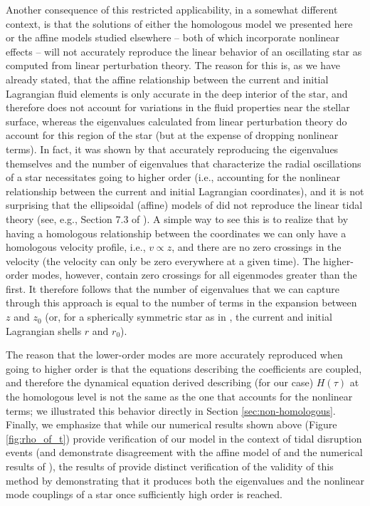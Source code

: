 \documentclass[twocolumn]{aastex62}
\begin{document}
Another consequence of this restricted applicability, in a somewhat different context, is that the solutions of either the homologous model we presented here or the affine models studied elsewhere -- both of which incorporate nonlinear effects -- will not accurately reproduce the linear behavior of an oscillating star as computed from linear perturbation theory. The reason for this is, as we have already stated, that the affine relationship between the current and initial Lagrangian fluid elements is only accurate in the deep interior of the star, and therefore does not account for variations in the fluid properties near the stellar surface, whereas the eigenvalues calculated from linear perturbation theory do account for this region of the star (but at the expense of dropping nonlinear terms). In fact, it was shown by \citet{coughlin21b} that accurately reproducing the eigenvalues themselves and the number of eigenvalues that characterize the radial oscillations of a star necessitates going to higher order (i.e., accounting for the nonlinear relationship between the current and initial Lagrangian coordinates), and it is not surprising that the ellipsoidal (affine) models of \citet{kochanek92, kosovichev92, lai94} did not reproduce the linear tidal theory (see, e.g., Section 7.3 of \citealt{lai94}). A simple way to see this is to realize that by having a homologous relationship between the coordinates we can only have a homologous velocity profile, i.e., $v \propto z$, and there are no zero crossings in the velocity (the velocity can only be zero everywhere at a given time). The higher-order modes, however, contain zero crossings for all eigenmodes greater than the first. It therefore follows that the number of eigenvalues that we can capture through this approach is equal to the number of terms in the expansion between $z$ and $z_0$ (or, for a spherically symmetric star as in \citealt{coughlin21b}, the current and initial Lagrangian shells $r$ and $r_0$). 

The reason that the lower-order modes are more accurately reproduced when going to higher order is that the equations describing the coefficients are coupled, and therefore the dynamical equation derived describing (for our case) $H(\tau)$ at the homologous level is not the same as the one that accounts for the nonlinear terms; we illustrated this behavior directly in Section \ref{sec:non-homologous}. Finally, we emphasize that while our numerical results shown above (Figure \ref{fig:rho_of_t}) provide verification of our model in the context of tidal disruption events (and demonstrate disagreement with the affine model of \citealt{carter83} and the numerical results of \citealt{brassart08}), the results of \citet{coughlin21b} provide distinct verification of the validity of this method by demonstrating that it produces both the eigenvalues and the nonlinear mode couplings of a star once sufficiently high order is reached.
\end{document}
